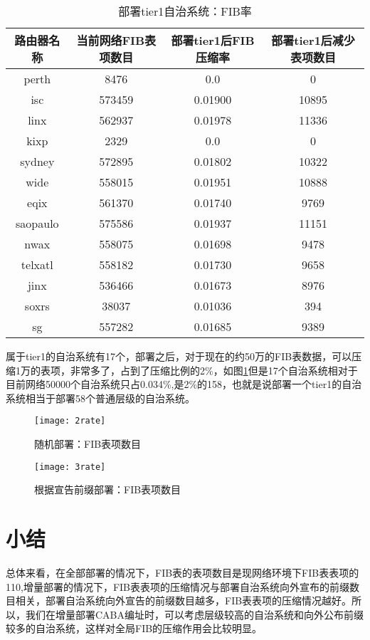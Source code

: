 \begin{table}[h]
    \centering
    \caption{部署tier1自治系统：FIB率}
    \label{tab:tieronefibdatarate}
    \begin{tabular}{|c|c|c|c|}
    \hline
            路由器名称 & 当前网络FIB表项数目 & 部署tier1后FIB压缩率 & 部署tier1后减少表项数目\\ \hline
            perth    & 8476   & 0.0   & 0  \\ \hline
            isc      & 573459 & 0.01900 & 10895   \\ \hline
            linx     & 562937 & 0.01978  & 11336   \\ \hline
            kixp     & 2329   & 0.0   & 0        \\ \hline
            sydney   & 572895 & 0.01802 & 10322      \\ \hline
            wide     & 558015 & 0.01951 &  10888         \\ \hline
            eqix     & 561370 & 0.01740 & 9769        \\ \hline
            saopaulo & 575586 & 0.01937 & 11151       \\ \hline
            nwax     & 558075 & 0.01698  &     9478     \\ \hline
            telxatl  & 558182 & 0.01730  &  9658      \\ \hline
            jinx     & 536466 &   0.01673   &     8976    \\ \hline
            soxrs    & 38037  & 0.01036     &  394   \\ \hline
            sg       & 557282 & 0.01685    & 9389\\ \hline
    \end{tabular}
\end{table}

属于tier1的自治系统有17个，部署之后，对于现在的约50万的FIB表数据，可以压缩1万的表项，非常多了，占到了压缩比例的2\%，如图\ref{tab:tieronefibdatarate}但是17个自治系统相对于目前网络50000个自治系统只占0.034\%,是2\%的1\/58，也就是说部署一个tier1的自治系统相当于部署58个普通层级的自治系统。

\begin{figure}
  \centering
  \texttt{[image: 2rate]}
  \caption{随机部署：FIB表项数目}
  \label{fig:2rate}
\end{figure}

\begin{figure}
  \centering
  \texttt{[image: 3rate]}
  \caption{根据宣告前缀部署：FIB表项数目}
  \label{fig:3rate}
\end{figure}

\section{小结}
总体来看，在全部部署的情况下，FIB表的表项数目是现网络环境下FIB表表项的1\/10,增量部署的情况下，FIB表表项的压缩情况与部署自治系统向外宣布的前缀数目相关，部署自治系统向外宣告的前缀数目越多，FIB表表项的压缩情况越好。所以，我们在增量部署CABA编址时，可以考虑层级较高的自治系统和向外公布前缀较多的自治系统，这样对全局FIB的压缩作用会比较明显。
